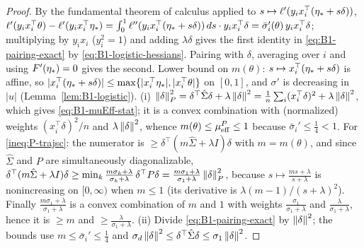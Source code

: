\begin{proof}
By the fundamental theorem of calculus applied to $s\mapsto\ell'(y_ix_i^\top(\eta_\ast+s\delta))$,
$\ell'(y_ix_i^\top\theta)-\ell'(y_ix_i^\top\eta_\ast)=\int_0^1\ell''(y_ix_i^\top(\eta_\ast+s\delta))\,ds\cdot y_ix_i^\top\delta
=\bar\sigma_i'(\theta)\,y_ix_i^\top\delta$; multiplying by $y_ix_i$ ($y_i^2=1$) and adding $\lambda\delta$
gives the first identity in \eqref{eq:B1-pairing-exact} by \eqref{eq:B1-logistic-hessians}. Pairing with
$\delta$, averaging over $i$ and using $F'(\eta_\ast)=0$ gives the second. Lower bound on $m(\theta)$:
$s\mapsto x_i^\top(\eta_\ast+s\delta)$ is affine, so $|x_i^\top(\eta_\ast+s\delta)|\le\max\{|x_i^\top\eta_\ast|,|x_i^\top\theta|\}$
on $[0,1]$, and $\sigma'$ is decreasing in $|u|$ (Lemma~\ref{lem:B1-logistic}).
(i) $\left\|\delta\right\|_P^2=\delta^\top\hat\Sigma\delta+\lambda\left\|\delta\right\|^2=\frac1n\sum_i(x_i^\top\delta)^2+\lambda\left\|\delta\right\|^2$,
which gives \eqref{eq:B1-muEff-stat}; it is a convex combination with (normalized) weights
$(x_i^\top\delta)^2/n$ and $\lambda\left\|\delta\right\|^2$, whence $m(\theta)\le\mu_{\mathrm{eff}}^P\le1$ because
$\bar\sigma_i'\le\frac14<1$. For \eqref{ineq:P-trajsc}: the numerator is $\ge\delta^\top(m\hat\Sigma+\lambda I)\delta$
with $m=m(\theta)$, and since $\hat\Sigma$ and $P$ are simultaneously diagonalizable,
$\delta^\top(m\hat\Sigma+\lambda I)\delta\ge\min_k\frac{m\sigma_k+\lambda}{\sigma_k+\lambda}\,\delta^\top P\delta
=\frac{m\sigma_1+\lambda}{\sigma_1+\lambda}\left\|\delta\right\|_P^2$, because $s\mapsto\frac{ms+\lambda}{s+\lambda}$ is
nonincreasing on $[0,\infty)$ when $m\le1$ (its derivative is $\lambda(m-1)/(s+\lambda)^2$). Finally
$\frac{m\sigma_1+\lambda}{\sigma_1+\lambda}$ is a convex combination of $m$ and $1$ with weights
$\frac{\sigma_1}{\sigma_1+\lambda}$ and $\frac{\lambda}{\sigma_1+\lambda}$, hence it is $\ge m$ and
$\ge\frac{\lambda}{\sigma_1+\lambda}$.
(ii) Divide \eqref{eq:B1-pairing-exact} by $\left\|\delta\right\|^2$; the bounds use $m\le\bar\sigma_i'\le\frac14$
and $\sigma_d\left\|\delta\right\|^2\le\delta^\top\hat\Sigma\delta\le\sigma_1\left\|\delta\right\|^2$.
\end{proof}

